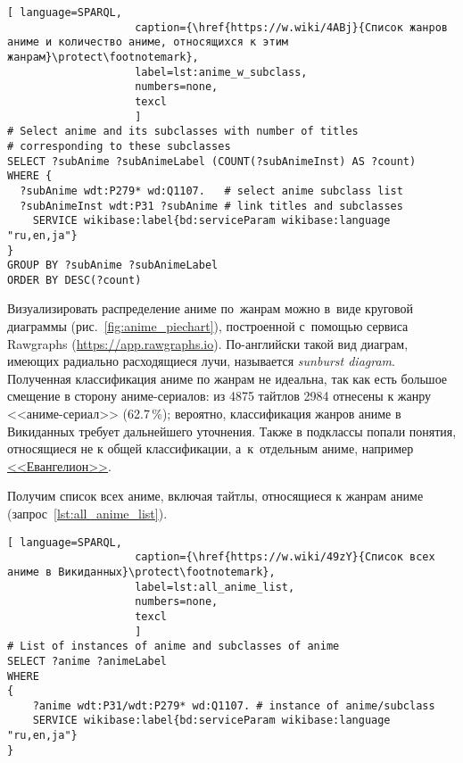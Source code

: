 \begin{lstlisting}[ language=SPARQL, 
                    caption={\href{https://w.wiki/4ABj}{Список жанров аниме и количество аниме, относящихся к этим жанрам}\protect\footnotemark},
                    label=lst:anime_w_subclass,
                    numbers=none,
                    texcl 
                    ]
# Select anime and its subclasses with number of titles
# corresponding to these subclasses
SELECT ?subAnime ?subAnimeLabel (COUNT(?subAnimeInst) AS ?count)
WHERE {
  ?subAnime wdt:P279* wd:Q1107.   # select anime subclass list
  ?subAnimeInst wdt:P31 ?subAnime # link titles and subclasses
    SERVICE wikibase:label{bd:serviceParam wikibase:language "ru,en,ja"}
}
GROUP BY ?subAnime ?subAnimeLabel
ORDER BY DESC(?count)
\end{lstlisting}%


Визуализировать распределение аниме по~жанрам можно в~виде 
круговой диаграммы (рис.~\ref{fig:anime_piechart}), 
построенной с~помощью сервиса 
Rawgraphs (\href{https://app.rawgraphs.io}{https://app.rawgraphs.io}). 
По-английски такой вид диаграм, имеющих радиально расходящиеся лучи, 
называется \emph{sunburst diagram}. 
%
Полученная классификация аниме по жанрам не идеальна, 
так как есть большое смещение в сторону аниме-сериалов: 
из \num{4875} тайтлов \num{2984} отнесены к жанру <<аниме-сериал>> (\num{62,7}\,\%); 
вероятно, классификация жанров аниме в Викиданных требует дальнейшего уточнения. 
Также в подклассы попали понятия, относящиеся не к общей классификации, 
а~к~отдельным аниме, например \href{https://w.wiki/4L5p}{<<Евангелион>>}.



\newpage
Получим список всех аниме, включая тайтлы, относящиеся к жанрам аниме (запрос~\ref{lst:all_anime_list}).

\begin{lstlisting}[ language=SPARQL, 
                    caption={\href{https://w.wiki/49zY}{Список всех аниме в Викиданных}\protect\footnotemark},
                    label=lst:all_anime_list,
                    numbers=none,
                    texcl 
                    ]
# List of instances of anime and subclasses of anime
SELECT ?anime ?animeLabel
WHERE
{
    ?anime wdt:P31/wdt:P279* wd:Q1107. # instance of anime/subclass
    SERVICE wikibase:label{bd:serviceParam wikibase:language "ru,en,ja"}
}
\end{lstlisting}%

